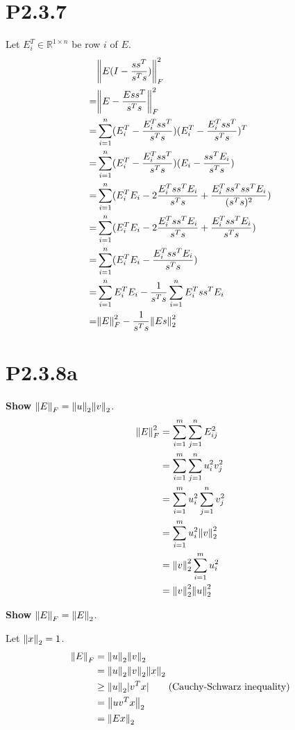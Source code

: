 \documentclass{article}
\begin{document}
\section*{P2.3.7}
Let $E_i^T \in \mathbb{R}^{1\times n}$ be row $i$ of $E$.
\begin{align*}
      & \norm{E(I-\frac{ss^T}{s^Ts})}_F^2                                                      \\
    = & \norm{E-\frac{Ess^T}{s^Ts}}_F^2                                                        \\
    = & \sum_{i=1}^n (E_i^T-\frac{E_i^Tss^T}{s^Ts})(E_i^T-\frac{E_i^Tss^T}{s^Ts})^T            \\
    = & \sum_{i=1}^n (E_i^T-\frac{E_i^Tss^T}{s^Ts})(E_i-\frac{ss^TE_i}{s^Ts})                  \\
    = & \sum_{i=1}^n (E_i^TE_i -2 \frac{E_i^Tss^TE_i}{s^Ts}+\frac{E_i^Tss^Tss^TE_i}{(s^Ts)^2}) \\
    = & \sum_{i=1}^n (E_i^TE_i -2 \frac{E_i^Tss^TE_i}{s^Ts}+\frac{E_i^Tss^TE_i}{s^Ts})         \\
    = & \sum_{i=1}^n (E_i^TE_i -\frac{E_i^Tss^TE_i}{s^Ts})                                     \\
    = & \sum_{i=1}^n E_i^TE_i - \frac{1}{s^Ts}\sum_{i=1}^n {E_i^Tss^TE_i}                      \\
    = & \norm{E}_F^2 - \frac{1}{s^Ts}\norm{Es}_2^2
\end{align*}

\section*{P2.3.8a}
\textbf{Show} $\norm{E}_F = \norm{u}_2\norm{v}_2$.
\begin{align*}
    \norm{E}_F^2
     & = \sum_{i=1}^m \sum_{j=1}^n
    E_{ij}^2                             \\
     & = \sum_{i=1}^m \sum_{j=1}^n
    u_i^2v_j^2                           \\
     & = \sum_{i=1}^m u_i^2 \sum_{j=1}^n
    v_j^2                                \\
     & =\sum_{i=1}^m u_i^2\norm{v}_2^2   \\
     & = \norm{v}_2^2 \sum_{i=1}^m u_i^2 \\
     & = \norm{v}_2^2 \norm{u}_2^2
\end{align*}

\textbf{Show} $\norm{E}_F = \norm{E}_2$.

Let $\norm{x}_2 = 1$.
\begin{align*}
    \norm{E}_F
     & = \norm{u}_2\norm{v}_2                                    \\
     & = \norm{u}_2\norm{v}_2 \norm{x}_2                         \\
     & \ge \norm{u}_2 |v^T x| \tag*{(Cauchy-Schwarz inequality)} \\
     & = \norm{uv^Tx}_2                                          \\
     & = \norm{Ex}_2
\end{align*}
\end{document}
